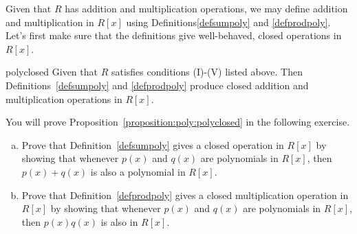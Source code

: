%
%
%
%
%

Given that $R$ has addition and multiplication operations, we may define addition and multiplication in $R[x]$ using Definitions\ref{defsumpoly} and \ref{defprodpoly}. Let's first make sure that the definitions  give well-behaved, closed operations in $R[x]$. 

\begin{prop}{polyclosed} Given that $R$ satisfies conditions (I)-(V) listed above. Then Definitions~\ref{defsumpoly} and \ref{defprodpoly} produce  closed addition and multiplication operations in $R[x]$.
\end{prop}

You will prove Proposition~\ref{proposition:poly:polyclosed} in the following exercise.

\begin{exercise}{}
\begin{enumerate}[(a)]
\item
Prove that Definition~\ref{defsumpoly} gives a closed operation in $R[x]$ by showing that whenever $p(x)$ and $q(x)$ are polynomials in $R[x]$, then $p(x)+q(x)$ is also a polynomial in $R[x]$.
\item
Prove that Definition~\ref{defprodpoly} gives a  closed multiplication operation in $R[x]$ by showing that whenever $p(x)$ and $q(x)$ are polynomials in $R[x]$, then $p(x)q(x)$ is also in $R[x]$.
\end{enumerate}
\end{exercise} 

